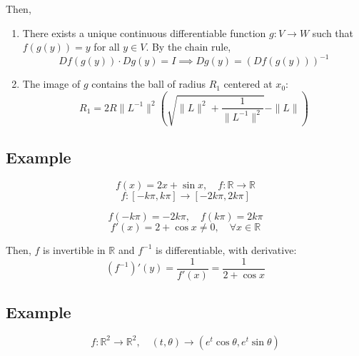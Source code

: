 \documentclass[11pt]{article}
\begin{document}
Then,
\begin{enumerate}
    \item There exists a unique continuous differentiable function $g : V \rightarrow W$ such that $f(g(y)) = y$ for all $y \in V$. By the chain rule,
    \[
    Df(g(y)) \cdot Dg(y) = I \implies Dg(y) = (Df(g(y)))^{-1}
    \]
    \item The image of $g$ contains the ball of radius $R_1$ centered at $x_0$:
    \[
    R_1 = 2R \|L^{-1}\|^2 \left( \sqrt{\|L\|^2 + \frac{1}{\|L^{-1}\|^2}} - \|L\| \right)
    \]
\end{enumerate}

\subsection*{Example}
\[
f(x) = 2x + \sin x, \quad f : \mathbb{R} \rightarrow \mathbb{R}
\]
\[
f : [-k \pi, k \pi] \rightarrow [-2k \pi, 2k \pi]
\]

\[
f(-k \pi) = -2k \pi, \quad f(k \pi) = 2k \pi
\]
\[
f'(x) = 2 + \cos x \neq 0, \quad \forall x \in \mathbb{R}
\]

Then, $f$ is invertible in $\mathbb{R}$ and $f^{-1}$ is differentiable, with derivative:
\[
(f^{-1})'(y) = \frac{1}{f'(x)} = \frac{1}{2 + \cos x}
\]

\subsection*{Example}
\[
f : \mathbb{R}^2 \rightarrow \mathbb{R}^2, \quad (t, \theta) \rightarrow (e^t \cos \theta, e^t \sin \theta)
\]
\end{document}
